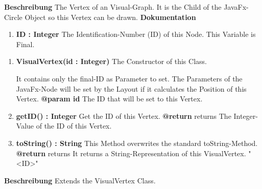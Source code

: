 				\textbf{Beschreibung}\newline
				The Vertex of an Visual-Graph.
				It is the Child of the JavaFx-Circle Object so this Vertex can be drawn.
				\textbf{Dokumentation}\newline
				\begin{enumerate}[-]
					\item{
						\textbf{ID : Integer} \newline
						The Identification-Number (ID) of this Node.
						This Variable is Final.
					}
				\end{enumerate}	
				\begin{enumerate}[+]
					\item{
						\textbf{VisualVertex(id : Integer)} \newline
						The Constructor of this Class.
						
						It contains only the final-ID as Parameter to set.
						The Parameters of the JavaFx-Node will be set by the Layout if it calculates the Position of this Vertex.
						\newline
						\textbf{@param id}
						The ID that will be set to this Vertex.
						\newline
					}
				\item{
					\textbf{getID() : Integer} \newline
					Get the ID of this Vertex.
					\newline
					\textbf{@return} returns
						The Integer-Value of the ID of this Vertex.
						\newline
				}
				\item{
					\textbf{toString() : String} \newline
					This Method overwrites the standard toString-Method.
					\newline
					\textbf{@return} returns
					It returns a String-Representation of this VisualVertex.
					"<ID>"
					\newline
				}
				\end{enumerate}			
				
				\textbf{Beschreibung}\newline
				Extends the VisualVertex Class.
				
